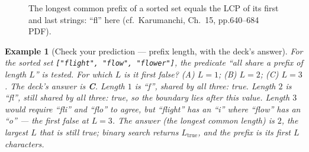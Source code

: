 \documentclass[11pt]{article}
\newtheorem{example}{Example}[section]
\begin{document}
\begin{figure}[h]
  \centering
  \caption{The longest common prefix of a sorted set equals the LCP of its first and last strings: ``fl'' here (cf.\ Karumanchi, Ch.~15, pp.640--684 PDF).}
  \label{fig:lcp}
\end{figure}

\begin{example}[Check your prediction --- prefix length, with the deck's answer]
For the sorted set \texttt{["flight", "flow", "flower"]}, the predicate ``all share a prefix of length $L$'' is tested. For which $L$ is it first \emph{false}? (A) $L = 1$; (B) $L = 2$; (C) $L = 3$. The deck's answer is \textbf{C}. Length $1$ is ``f'', shared by all three: true. Length $2$ is ``fl'', still shared by all three: true, so the boundary lies \emph{after} this value. Length $3$ would require ``fli'' and ``flo'' to agree, but ``flight'' has an ``i'' where ``flow'' has an ``o'' --- the first false at $L = 3$. The answer (the longest common length) is $2$, the largest $L$ that is still true; binary search returns $L_{\text{true}}$, and the prefix is its first $L$ characters. 
\end{example}
\end{document}
